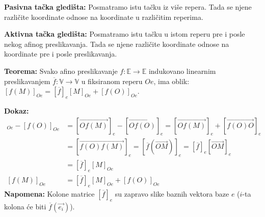 \documentclass[12pt]{article}
\newcommand{\vek}[1]{\overrightarrow{#1}}
\begin{document}
\textbf{Pasivna tačka gledišta:} Posmatramo istu tačku iz više repera. Tada se
njene različite koordinate odnose na koordinate u različitim reperima.
\par

\textbf{Aktivna tačka gledišta:} Posmatramo istu tačku u istom reperu pre i
posle nekog afinog preslikavanja. Tada se njene različite koordinate odnose na
koordinate pre i posle preslikavanja.

\textbf{Teorema:} Svako afino preslikavanje
$f:\mathbb{E}\rightarrow\mathbb{E}$ indukovano linearnim preslikavanjem
$\overline{f}:\mathbb{V}\rightarrow\mathbb{V}$ u fiksiranom reperu $Oe$, ima
oblik: $[f(M)]_{Oe}=[\overline{f}]_{e}[M]_{Oe}+[f(O)]_{Oe}$.
\par
\textbf{Dokaz:}
\begin{align*}
    [f(M)]_{Oe}-[f(O)]_{Oe} & =[\vek{Of(M)}]_e-[\vek{Of(O)}]_e
    =[\vek{Of(M)}]_e+[\vek{f(O)O}]_e                                         \\
                            & =[\vek{f(O)f(M)}]_e=[\overline{f}(\vek{OM})]_e
    =[\overline{f}]_e[\vek{OM}]_e                                            \\
                            & =[\overline{f}]_e[M]_{Oe}                      \\
    [f(M)]_{Oe}             & =[\overline{f}]_{e}[M]_{Oe}+[f(O)]_{Oe}
\end{align*}
\textbf{Napomena:} Kolone matrice $[\overline{f}]_e$ su zapravo slike baznih
vektora baze $e$ ($i$-ta kolona će biti $\overline{f}(\vek{e_i})$).
\par
\end{document}
